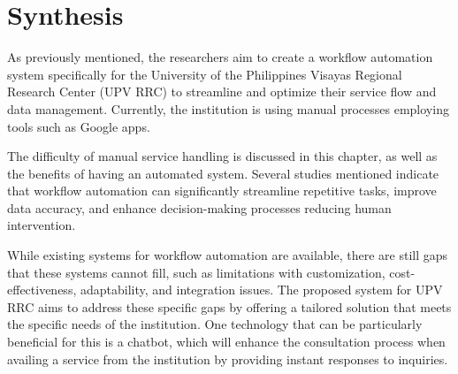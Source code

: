 \section{Synthesis}

As previously mentioned, the researchers aim to create a workflow automation system specifically for the University of the Philippines Visayas Regional Research Center (UPV RRC) to streamline and optimize their service flow and data management. Currently, the institution is using manual processes employing tools such as Google apps.

The difficulty of manual service handling is discussed in this chapter, as well as the benefits of having an automated system. Several studies mentioned indicate that workflow automation can significantly streamline repetitive tasks, improve data accuracy, and enhance decision-making processes reducing human intervention. 

While existing systems for workflow automation are available, there are still gaps that these systems cannot fill, such as limitations with customization, cost-effectiveness, adaptability, and integration issues. The proposed system for UPV RRC aims to address these specific gaps by offering a tailored solution that meets the specific needs of the institution. One technology that can be particularly beneficial for this is a chatbot, which will enhance the consultation process when availing a service from the institution by providing instant responses to inquiries.














